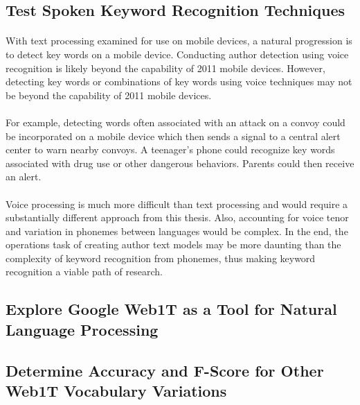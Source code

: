 \subsection{Test Spoken Keyword Recognition Techniques} 
\paragraph*{}With text processing examined for use on mobile devices, a natural progression is to detect key words on a mobile device.  Conducting author detection using voice recognition is likely beyond the capability of 2011 mobile devices. However, detecting key words or combinations of key words using voice techniques may not be beyond the capability of 2011 mobile devices.
\paragraph*{} For example, detecting words often associated with an attack on a convoy could be incorporated on a mobile device which then sends a signal to a central alert center to warn nearby convoys.  A teenager's phone could recognize key words associated with drug use or other dangerous behaviors.  Parents could then receive an alert.
\paragraph*{} Voice processing is much more difficult than text processing and would require a substantially different approach from this thesis.  Also, accounting for voice tenor and variation in phonemes between languages would be complex. In the end, the operations task of creating author text models may be more daunting than the complexity of keyword recognition from phonemes, thus making keyword recognition a viable path of research.




\begin{singlespace}
\section{Explore Google Web1T as a Tool for Natural Language Processing}
\end{singlespace}

	\begin{singlespace}
	\subsection{Determine Accuracy and F-Score for Other Web1T Vocabulary Variations}
	\end{singlespace}
